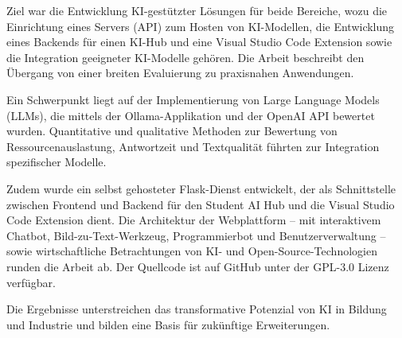 {Ziel war die Entwicklung KI-gestützter Lösungen für beide Bereiche, wozu die Einrichtung eines Servers (API) zum Hosten von KI-Modellen, die Entwicklung eines Backends für einen KI-Hub und eine Visual Studio Code Extension sowie die Integration geeigneter KI-Modelle gehören. Die Arbeit beschreibt den Übergang von einer breiten Evaluierung zu praxisnahen Anwendungen.
    
Ein Schwerpunkt liegt auf der Implementierung von Large Language Models (LLMs), die mittels der Ollama-Applikation und der OpenAI API bewertet wurden. Quantitative und qualitative Methoden zur Bewertung von Ressourcenauslastung, Antwortzeit und Textqualität führten zur Integration spezifischer Modelle.
    
Zudem wurde ein selbst gehosteter Flask-Dienst entwickelt, der als Schnittstelle zwischen Frontend und Backend für den Student AI Hub und die Visual Studio Code Extension dient. Die Architektur der Webplattform – mit interaktivem Chatbot, Bild-zu-Text-Werkzeug, Programmierbot und Benutzerverwaltung – sowie wirtschaftliche Betrachtungen von KI- und Open-Source-Technologien runden die Arbeit ab. Der Quellcode ist auf GitHub unter der GPL-3.0 Lizenz verfügbar.
    
Die Ergebnisse unterstreichen das transformative Potenzial von KI in Bildung und Industrie und bilden eine Basis für zukünftige Erweiterungen.    
}